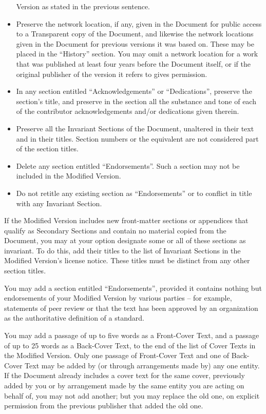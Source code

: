 \documentclass[oneside,a4paper]{book}
\begin{document}
\begin{itemize}
   Version as stated in the previous sentence.
\item Preserve the network location, if any, given in the Document for
   public access to a Transparent copy of the Document, and likewise
   the network locations given in the Document for previous versions
   it was based on.  These may be placed in the ``History'' section.
   You may omit a network location for a work that was published at
   least four years before the Document itself, or if the original
   publisher of the version it refers to gives permission.
\item In any section entitled ``Acknowledgements'' or ``Dedications'',
   preserve the section's title, and preserve in the section all the
   substance and tone of each of the contributor acknowledgements
   and/or dedications given therein.
\item Preserve all the Invariant Sections of the Document,
   unaltered in their text and in their titles.  Section numbers
   or the equivalent are not considered part of the section titles.
\item Delete any section entitled ``Endorsements''.  Such a section
   may not be included in the Modified Version.
\item Do not retitle any existing section as ``Endorsements''
   or to conflict in title with any Invariant Section.

\end{itemize}

If the Modified Version includes new front-matter sections or
appendices that qualify as Secondary Sections and contain no material
copied from the Document, you may at your option designate some or all
of these sections as invariant.  To do this, add their titles to the
list of Invariant Sections in the Modified Version's license notice.
These titles must be distinct from any other section titles.

You may add a section entitled ``Endorsements'', provided it contains
nothing but endorsements of your Modified Version by various
parties -- for example, statements of peer review or that the text has
been approved by an organization as the authoritative definition of a
standard.

You may add a passage of up to five words as a Front-Cover Text, and a
passage of up to 25 words as a Back-Cover Text, to the end of the list
of Cover Texts in the Modified Version.  Only one passage of
Front-Cover Text and one of Back-Cover Text may be added by (or
through arrangements made by) any one entity.  If the Document already
includes a cover text for the same cover, previously added by you or
by arrangement made by the same entity you are acting on behalf of,
you may not add another; but you may replace the old one, on explicit
permission from the previous publisher that added the old one.
\end{document}
